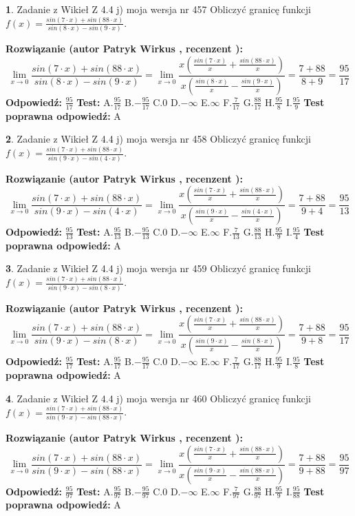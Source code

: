 \documentclass[12pt, a4paper]{article}
\theoremstyle{definition} %
\newtheorem{zad}{}
\newcommand{\zadStart}[1]{\begin{zad}#1\newline}
\newcommand{\zadStop}{\end{zad}}
\newcommand{\rozwStart}[2]{\noindent \textbf{Rozwiązanie (autor #1 , recenzent #2): }\newline}
\newcommand{\rozwStop}{\newline}
\newcommand{\odpStart}{\noindent \textbf{Odpowiedź:}\newline}
\newcommand{\odpStop}{\newline}
\newcommand{\testStart}{\noindent \textbf{Test:}\newline}
\newcommand{\testStop}{\newline}
\newcommand{\kluczStart}{\noindent \textbf{Test poprawna odpowiedź:}\newline}
\newcommand{\kluczStop}{\newline}
\begin{document}
\zadStart{Zadanie z Wikieł Z 4.4 j) moja wersja nr 457}
Obliczyć granicę funkcji $f(x)=\frac{sin(7\cdot x) +sin(88\cdot x)}{sin(8\cdot x) -sin(9\cdot x)}$.
\zadStop
\rozwStart{Patryk Wirkus}{}
$$\lim\limits_{x\to 0}\frac{sin(7\cdot x) +sin(88\cdot x)}{sin(8\cdot x) -sin(9\cdot x)}=\lim\limits_{x\to 0}\frac{x(\frac{sin(7\cdot x)}{x}+\frac{sin(88\cdot x)}{x})}{x(\frac{sin(8\cdot x)}{x}-\frac{sin(9\cdot x)}{x})}=\frac{7+88}{8+9} = \frac{95}{17}$$
\rozwStop
\odpStart
$\frac{95}{17}$
\odpStop
\testStart
A.$\frac{95}{17}$
B.$-\frac{95}{17}$
C.$0$
D.$-\infty$
E.$\infty$
F.$\frac{7}{17}$
G.$\frac{88}{17}$
H.$\frac{95}{8}$
I.$\frac{95}{9}$
\testStop
\kluczStart
A
\kluczStop



\zadStart{Zadanie z Wikieł Z 4.4 j) moja wersja nr 458}
Obliczyć granicę funkcji $f(x)=\frac{sin(7\cdot x) +sin(88\cdot x)}{sin(9\cdot x) -sin(4\cdot x)}$.
\zadStop
\rozwStart{Patryk Wirkus}{}
$$\lim\limits_{x\to 0}\frac{sin(7\cdot x) +sin(88\cdot x)}{sin(9\cdot x) -sin(4\cdot x)}=\lim\limits_{x\to 0}\frac{x(\frac{sin(7\cdot x)}{x}+\frac{sin(88\cdot x)}{x})}{x(\frac{sin(9\cdot x)}{x}-\frac{sin(4\cdot x)}{x})}=\frac{7+88}{9+4} = \frac{95}{13}$$
\rozwStop
\odpStart
$\frac{95}{13}$
\odpStop
\testStart
A.$\frac{95}{13}$
B.$-\frac{95}{13}$
C.$0$
D.$-\infty$
E.$\infty$
F.$\frac{7}{13}$
G.$\frac{88}{13}$
H.$\frac{95}{9}$
I.$\frac{95}{4}$
\testStop
\kluczStart
A
\kluczStop



\zadStart{Zadanie z Wikieł Z 4.4 j) moja wersja nr 459}
Obliczyć granicę funkcji $f(x)=\frac{sin(7\cdot x) +sin(88\cdot x)}{sin(9\cdot x) -sin(8\cdot x)}$.
\zadStop
\rozwStart{Patryk Wirkus}{}
$$\lim\limits_{x\to 0}\frac{sin(7\cdot x) +sin(88\cdot x)}{sin(9\cdot x) -sin(8\cdot x)}=\lim\limits_{x\to 0}\frac{x(\frac{sin(7\cdot x)}{x}+\frac{sin(88\cdot x)}{x})}{x(\frac{sin(9\cdot x)}{x}-\frac{sin(8\cdot x)}{x})}=\frac{7+88}{9+8} = \frac{95}{17}$$
\rozwStop
\odpStart
$\frac{95}{17}$
\odpStop
\testStart
A.$\frac{95}{17}$
B.$-\frac{95}{17}$
C.$0$
D.$-\infty$
E.$\infty$
F.$\frac{7}{17}$
G.$\frac{88}{17}$
H.$\frac{95}{9}$
I.$\frac{95}{8}$
\testStop
\kluczStart
A
\kluczStop



\zadStart{Zadanie z Wikieł Z 4.4 j) moja wersja nr 460}
Obliczyć granicę funkcji $f(x)=\frac{sin(7\cdot x) +sin(88\cdot x)}{sin(9\cdot x) -sin(88\cdot x)}$.
\zadStop
\rozwStart{Patryk Wirkus}{}
$$\lim\limits_{x\to 0}\frac{sin(7\cdot x) +sin(88\cdot x)}{sin(9\cdot x) -sin(88\cdot x)}=\lim\limits_{x\to 0}\frac{x(\frac{sin(7\cdot x)}{x}+\frac{sin(88\cdot x)}{x})}{x(\frac{sin(9\cdot x)}{x}-\frac{sin(88\cdot x)}{x})}=\frac{7+88}{9+88} = \frac{95}{97}$$
\rozwStop
\odpStart
$\frac{95}{97}$
\odpStop
\testStart
A.$\frac{95}{97}$
B.$-\frac{95}{97}$
C.$0$
D.$-\infty$
E.$\infty$
F.$\frac{7}{97}$
G.$\frac{88}{97}$
H.$\frac{95}{9}$
I.$\frac{95}{88}$
\testStop
\kluczStart
A
\kluczStop
\end{document}

